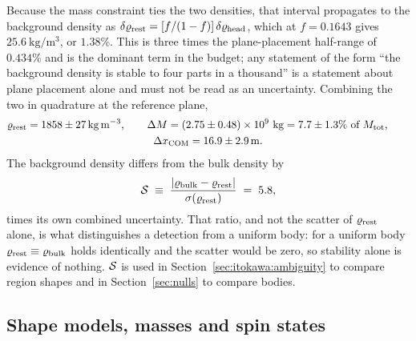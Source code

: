 Because the mass constraint ties the two densities, that interval
propagates to the background density as
$\delta\varrho_{\mathrm{rest}} = [f/(1-f)]\,\delta\varrho_{\mathrm{head}}$, which at $f = 0.1643$
gives $\SI{25.6}{\kilo\gram\per\cubic\metre}$, or $1.38\%$. This is three
times the plane-placement half-range of $0.434\%$ and is the dominant
term in the budget; any statement of the form ``the background density is
stable to four parts in a thousand'' is a statement about plane placement
alone and must not be read as an uncertainty. Combining the two in
quadrature at the reference plane,
%
\begin{multline}
\varrho_{\mathrm{rest}} = 1858 \pm \SI{27}{\kilo\gram\per\cubic\metre},
\qquad
\Delta M = (2.75 \pm 0.48)\times10^{9}~\mathrm{kg}
       = 7.7 \pm 1.3\%~\text{of}~M_{\mathrm{tot}} ,
\qquad \\
\Delta x_{\mathrm{COM}} = 16.9 \pm \SI{2.9}{\metre} .
\label{eq:budget}
\end{multline}
%
The background density differs from the bulk density by
%
\begin{equation}
\mathcal{S} \;\equiv\;
\frac{\lvert \varrho_{\mathrm{bulk}} - \varrho_{\mathrm{rest}} \rvert}{\sigma(\varrho_{\mathrm{rest}})}
\;=\; 5.8 ,
\label{eq:sstat}
\end{equation}
%
times its own combined uncertainty. That ratio, and not the scatter of
$\varrho_{\mathrm{rest}}$ alone, is what distinguishes a detection from a uniform body:
for a uniform body $\varrho_{\mathrm{rest}} \equiv \varrho_{\mathrm{bulk}}$ holds identically and the
scatter would be zero, so stability alone is evidence of nothing.
$\mathcal{S}$ is used in Section~\ref{sec:itokawa:ambiguity} to compare region
shapes and in Section~\ref{sec:nulls} to compare bodies.

\subsection{Shape models, masses and spin states}
\label{sec:methods:shapes}

